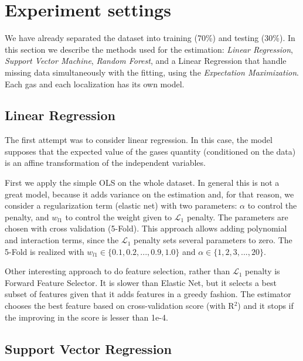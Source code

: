 \section{Experiment settings}
\label{sec:experiments}

We have already separated the dataset into training (70\%) and testing (30\%). In this
section we describe the methods used for the estimation: {\em Linear
Regression}, {\em Support Vector Machine}, {\em Random Forest}, and a Linear Regression that handle missing data simultaneously with the
fitting, using the {\em Expectation Maximization}. Each gas and each localization has its own model. 

\subsection{Linear Regression}

The first attempt was to consider linear regression. In this case, the model
supposes that the expected value of the gases quantity (conditioned on the
data) is an affine transformation of the independent variables. 

First we apply the simple OLS on the whole dataset. In general this is not a
great model, because it adds variance on the estimation and, for that reason, we consider a regularization term (elastic
net) with two parameters: $\alpha$ to control the penalty, and $w_{l1}$ to
control the weight given to $\mathcal{L}_1$ penalty. The parameters are chosen
with cross validation (5-Fold). This approach allows adding polynomial and
interaction terms, since the $\mathcal{L}_1$ penalty sets several parameters
to zero. The 5-Fold is realized with $w_{l1} \in \{0.1, 0.2, ..., 0.9, 1.0\}$
and $\alpha \in \{1,2,3,...,20\}$. 

Other interesting approach to do feature selection, rather than $\mathcal{L}_1$
penalty is Forward Feature Selector. It is slower than Elastic Net, but it
selects a best subset of features given that it adds     features in a greedy
fashion. The estimator chooses the best feature based on
cross-validation score (with R$^2$) and it stops if the improving in the score is lesser than 1e-4. 

\subsection{Support Vector Regression}

